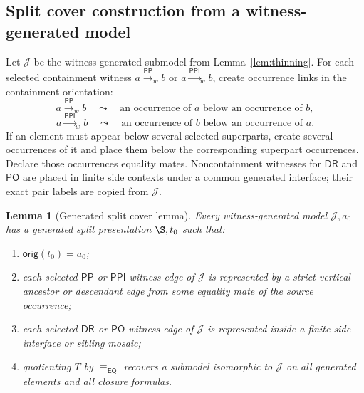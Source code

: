 \documentclass[11pt]{article}
\newtheorem{lemma}[theorem]{Lemma}
\newcommand{\EQ}{\mathsf{EQ}}
\newcommand{\DR}{\mathsf{DR}}
\newcommand{\PO}{\mathsf{PO}}
\newcommand{\PP}{\mathsf{PP}}
\newcommand{\PPI}{\mathsf{PPI}}
\newcommand{\J}{\mathcal J}
\newcommand{\orig}{\mathsf{orig}}
\newcommand{\eqc}{\equiv_{\EQ}}
\begin{document}
\subsection{Split cover construction from a witness-generated model}

Let $\J$ be the witness-generated submodel from Lemma~\ref{lem:thinning}.  For each selected containment witness $a\xrightarrow{\PP}_w b$ or $a\xrightarrow{\PPI}_w b$, create occurrence links in the containment orientation:
\[
  a\xrightarrow{\PP}_w b \quad\leadsto\quad
  \text{an occurrence of }a\text{ below an occurrence of }b,
\]
\[
  a\xrightarrow{\PPI}_w b \quad\leadsto\quad
  \text{an occurrence of }b\text{ below an occurrence of }a.
\]
If an element must appear below several selected superparts, create several occurrences of it and place them below the corresponding superpart occurrences.  Declare those occurrences equality mates.  Noncontainment witnesses for $\DR$ and $\PO$ are placed in finite side contexts under a common generated interface; their exact pair labels are copied from $\J$.

\begin{lemma}[Generated split cover lemma]\label{lem:split-cover}
Every witness-generated model $\J,a_0$ has a generated split presentation $\S,t_0$ such that:
\begin{enumerate}[label=(C\arabic*)]
\item $\orig(t_0)=a_0$;
\item each selected $\PP$ or $\PPI$ witness edge of $\J$ is represented by a strict vertical ancestor or descendant edge from some equality mate of the source occurrence;
\item each selected $\DR$ or $\PO$ witness edge of $\J$ is represented inside a finite side interface or sibling mosaic;
\item quotienting $T$ by $\eqc$ recovers a submodel isomorphic to $\J$ on all generated elements and all closure formulas.
\end{enumerate}
\end{lemma}
\end{document}
